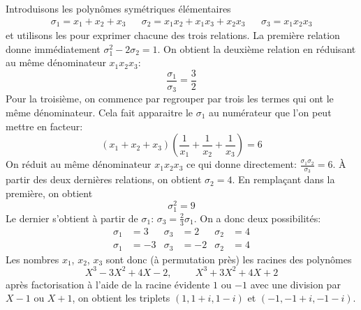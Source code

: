 Introduisons les polynômes symétriques élémentaires
\begin{align*}
 \sigma_1 = x_1+x_2+x_3 & & \sigma_2 = x_1x_2+x_1x_3+x_2x_3 & & \sigma_3=x_1x_2x_3
\end{align*}
et utilisons les pour exprimer chacune des trois relations.\newline
La première relation donne immédiatement $\sigma_1^2 -2\sigma_2 = 1$. \newline
On obtient la deuxième relation en réduisant au même dénominateur $x_1x_2x_3$:
\begin{displaymath}
 \frac{\sigma_1}{\sigma_3}=\frac{3}{2}
\end{displaymath}
Pour la troisième, on commence par regrouper par trois les termes qui ont le même dénominateur. Cela fait apparaitre le $\sigma_1$ au numérateur que l'on peut mettre en facteur:
\begin{displaymath}
 (x_1+x_2+x_3)\left( \frac{1}{x_1}+\frac{1}{x_2}+\frac{1}{x_3}\right) =6
\end{displaymath}
On réduit au même dénominateur $x_1x_2x_3$ ce qui donne directement: $\frac{\sigma_1\sigma_2}{\sigma_3}=6$.\newline
\`A partir des deux dernières relations, on obtient $\sigma_2=4$.\newline
En remplaçant dans la première, on obtient
\begin{displaymath}
 \sigma_1^2 = 9
\end{displaymath}
Le dernier s'obtient à partir de $\sigma_1$: $\sigma_3 = \frac{2}{3}\sigma_1$. 
On a donc deux possibilités:
\begin{align*}
 \sigma_1&=3 & \sigma_3&=2 & \sigma_2&= 4 \\
 \sigma_1&=-3 & \sigma_3&=-2 & \sigma_2&= 4 
\end{align*}
Les nombres $x_1$, $x_2$, $x_3$ sont donc (à permutation près) les racines des polynômes
\begin{displaymath}
 X^3-3X^2+4X-2, \hspace{1cm} X^3+3X^2+4X+2
\end{displaymath}
après factorisation à l'aide de la racine évidente $1$ ou $-1$ avec une division par $X-1$ ou $X+1$, on obtient les triplets $(1, 1 + i,1 - i)$ et $(-1,-1 + i,-1 - i)$.

